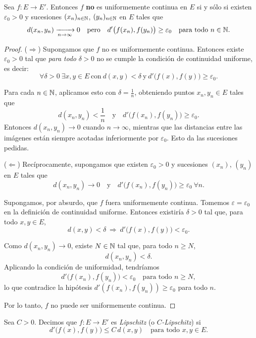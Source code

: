 \begin{prop}
Sea $f : E \to E'$. Entonces $f$ \textbf{no} es uniformemente continua en $E$
si y sólo si existen $\varepsilon_0>0$ y sucesiones
$(x_n)_{n\in\mathbb{N}}$, $(y_n)_{n\in\mathbb{N}}$ en $E$ tales que
\[
d(x_n,y_n) \xrightarrow[n\to\infty]{} 0
\quad \text{pero} \quad
d'\bigl(f(x_n),f(y_n)\bigr) \ge \varepsilon_0
\quad \text{para todo } n \in \mathbb{N}.
\]
\end{prop}

\begin{proof}
($\Rightarrow$) Supongamos que $f$ no es uniformemente continua.
Entonces existe $\varepsilon_0>0$ tal que \emph{para todo} $\delta>0$
no se cumple la condición de continuidad uniforme, es decir:
\[
\forall \delta>0\ \exists x,y \in E\ \text{con}\ d(x,y)<\delta
\ \text{y}\ d'\bigl(f(x),f(y)\bigr) \ge \varepsilon_0.
\]

Para cada $n \in \mathbb{N}$, aplicamos esto con $\delta = \frac{1}{n}$, obteniendo
puntos $x_n,y_n \in E$ tales que
\[
d(x_n,y_n) < \frac{1}{n}
\quad \text{y} \quad
d'\bigl(f(x_n),f(y_n)\bigr) \ge \varepsilon_0.
\]
Entonces $d(x_n,y_n) \to 0$ cuando $n \to \infty$, mientras que
las distancias entre las imágenes están siempre acotadas inferiormente
por $\varepsilon_0$. Esto da las sucesiones pedidas.

\medskip

($\Leftarrow$) Recíprocamente, supongamos que existen $\varepsilon_0>0$
y sucesiones $(x_n)$, $(y_n)$ en $E$ tales que
\[
d(x_n,y_n) \to 0
\quad \text{y} \quad
d'\bigl(f(x_n),f(y_n)\bigr) \ge \varepsilon_0\ \forall n.
\]

Supongamos, por absurdo, que $f$ fuera uniformemente continua.
Tomemos $\varepsilon = \varepsilon_0$ en la definición de continuidad
uniforme. Entonces existiría $\delta>0$ tal que, para todo $x,y \in E$,
\[
d(x,y) < \delta \ \Rightarrow\ d'\bigl(f(x),f(y)\bigr) < \varepsilon_0.
\]

Como $d(x_n,y_n) \to 0$, existe $N \in \mathbb{N}$ tal que, para todo $n \ge N$,
\[
d(x_n,y_n) < \delta.
\]
Aplicando la condición de uniformidad, tendríamos
\[
d'\bigl(f(x_n),f(y_n)\bigr) < \varepsilon_0
\quad \text{para todo } n \ge N,
\]
lo que contradice la hipótesis
$d'(f(x_n),f(y_n)) \ge \varepsilon_0$ para todo $n$.

Por lo tanto, $f$ no puede ser uniformemente continua.
\end{proof}

\begin{defi}
Sea $C>0$. Decimos que $f : E \to E'$ es \emph{Lipschitz} (o
\emph{$C$-Lipschitz}) si
\[
d'\bigl(f(x),f(y)\bigr) \le C\, d(x,y)
\quad \text{para todo } x,y \in E.
\]
\end{defi}

